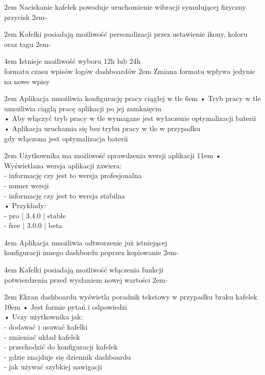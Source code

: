 {2em}{
    Naciskanie kafelek powoduje uruchomienie wibracji symulującej fizyczny przycisk
}
{2em}{-}

{2em}{
    Kafelki posiadają możliwość personalizacji przez ustawienie ikony, koloru oraz tagu
}
{2em}{-}

{4em}{
    Istnieje możliwość wyboru 12h lub 24h\\
    formatu czasu wpisów logów dashboardów
}
{2em}{
    Zmiana formatu wpływa jedynie na nowe wpisy
}

{2em}{
    Aplikacja umożliwia konfigurację pracy ciągłej w tle
}
{6em}{
    • Tryb pracy w tle umożliwia ciągłą pracę aplikacji po jej zamknięciu\\
    • Aby włączyć tryb pracy w tle wymagane jest wyłaczenie optymalizacji baterii\\
    • Aplikacja uruchamia się bez trybu pracy w tle w przypadku\\
    \hspace*{0.5em} gdy włączona jest optymalizacja baterii
}

{2em}{
    Użytkownika ma możliwość sprawdzenia wersji aplikacji
}
{11em}{
    • Wyświetlana wersja aplikacji zawiera:\\
    - informację czy jest to wersja profesjonalna\\
    - numer wersji\\
    - informację czy jest to wersja stabilna\\

    • Przykłady:\\
    - pro | 3.4.0 | stable\\
    - free | 3.0.0 | beta
}

{4em}{
    Aplikacja umożliwia odtworzenie już istniejącej\\
    konfiguracji innego dashbordu poprzez kopiowanie
}
{2em}{-}

{4em}{
    Kafelki posiadają możliwość włączenia funkcji\\
    potwierdzenia przed wysłaniem nowej wartości
}
{2em}{-}

{2em}{
    Ekran dashboardu wyświetla poradnik tekstowy w przypadku braku kafelek
}
{10em}{
    • Jest formie pytań i odpowiedzi\\
    • Uczy użytkownika jak:\\
    - dodawać i usuwać kafelki\\
    - zmieniać układ kafelek\\
    - przechodzić do konfiguracji kafelek\\
    - gdzie znajduje się dziennik dashboardu\\
    - jak używać szybkiej nawigacji
}

